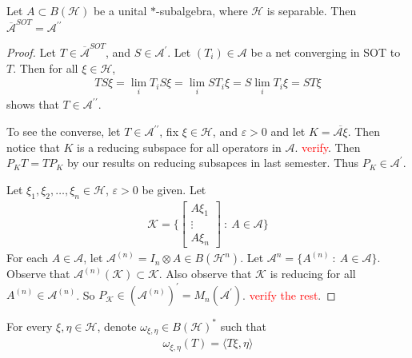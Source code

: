 

\begin{theorem}
  Let $A \subset B(\mathcal{H})$ be a unital $*$-subalgebra, where
  $\mathcal{H}$ is separable. Then $\overline{ \mathcal{A}}^{SOT} =
  \mathcal{A}^{\prime \prime}$
\end{theorem}
\begin{proof}
  Let $T \in \overline{\mathcal{A}}^{SOT}$, and $S \in
  \mathcal{A}^\prime$. Let $(T_i) \in \mathcal{A}$ be a net
  converging in SOT to $T$. Then for all $\xi \in \mathcal{H}$,
  \begin{align*}
    TS \xi = \lim_{i} T_iS \xi = \lim_{i} ST_i \xi = S \lim_i T_i \xi = ST \xi
  \end{align*}
  shows that $T \in \mathcal{A}^{\prime\prime}$.

  To see the converse, let $T \in \mathcal{A}^{\prime \prime}$, fix
  $\xi \in \mathcal{H}$, and $\varepsilon >
  0$ and let $K = \overline{\mathcal{A} \xi}$. Then notice that $K$
  is a reducing subspace for all operators in $\mathcal{A}$.
  \textcolor{red}{verify}. Then $P_K T = TP_K$ by our results on
  reducing subsapces in last semester. Thus $P_K \in \mathcal{A}^\prime$.

  Let $\xi_1 , \xi_2 , \ldots , \xi_n \in \mathcal{H}$, $\varepsilon>
  0$ be given. Let
  \begin{align*}
    \mathcal{K} = \Big \{
      \begin{bmatrix}%
        A \xi_1 \\
        \vdots \\
        A \xi_n
    \end{bmatrix}  \ : \  A \in \mathcal{A} \Big \}
  \end{align*}
  For each $A \in \mathcal{A}$, let $\mathcal{A}^{(n)} = I_n \otimes A\in
  B(\mathcal{H}^n)$. Let $\mathcal{A}^n = \{ A^{(n)}  \ : \  A \in
  \mathcal{A} \}$. Observe that $\mathcal{A}^{(n)}(\mathcal{K})
  \subset \mathcal{K}$. Also observe that $\mathcal{K}$ is reducing
  for all $A^{(n)} \in \mathcal{A}^{(n)}$. So $P_{\mathcal{K}} \in
  (\mathcal{A}^{(n)})^\prime = M_n(\mathcal{A}^\prime)$.
  \textcolor{red}{verify the rest}.
\end{proof}

\begin{definition}
  For every $\xi, \eta \in \mathcal{H}$, denote $\omega_{\xi, \eta}
  \in B(\mathcal{H})^*$ such that
  \begin{align*}
    \omega_{\xi, \eta}(T) = \langle T \xi ,  \eta \rangle
  \end{align*}
\end{definition}

